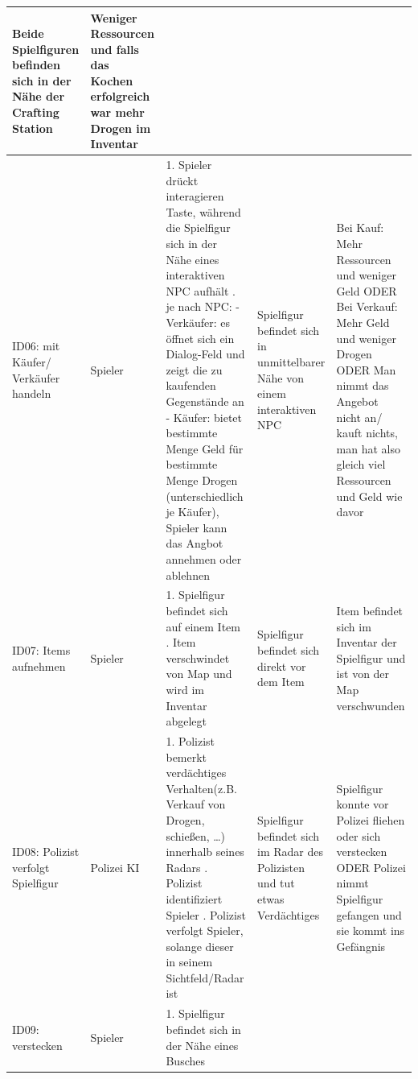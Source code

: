 \begin{longtable}{|p{1.6cm}|p{1.9cm}|p{5.5cm}|p{3.2cm}|p{4.2cm}|}
    Beide Spielfiguren befinden sich in der Nähe der Crafting Station &
    Weniger Ressourcen und falls das Kochen erfolgreich war mehr Drogen im Inventar \\
    \hline
    ID06: mit Käufer/ Verkäufer handeln & Spieler &
    1. Spieler drückt interagieren Taste, während die Spielfigur sich in der Nähe eines interaktiven NPC aufhält \newline
    2. je nach NPC: \newline
    - Verkäufer: es öffnet sich ein Dialog-Feld und zeigt die zu kaufenden Gegenstände an \newline
    - Käufer: bietet bestimmte Menge Geld für bestimmte Menge Drogen (unterschiedlich je Käufer), Spieler kann das Angbot annehmen oder ablehnen &
    Spielfigur befindet sich in unmittelbarer Nähe von einem interaktiven NPC &
    Bei Kauf: Mehr Ressourcen und weniger Geld \newline
    ODER \newline
    Bei Verkauf: Mehr Geld und weniger Drogen \newline
    ODER \newline
    Man nimmt das Angebot nicht an/ kauft nichts, man hat also gleich viel Ressourcen und Geld wie davor\\
    \hline
    ID07: Items aufnehmen & Spieler &
    1. Spielfigur befindet sich auf einem Item \newline
    2. Item verschwindet von Map und wird im Inventar abgelegt &
    Spielfigur befindet sich direkt vor dem Item &
    Item befindet sich im Inventar der Spielfigur und ist von der Map verschwunden \\
    \hline
    ID08: Polizist verfolgt Spielfigur & Polizei KI&
    1. Polizist bemerkt verdächtiges Verhalten(z.B. Verkauf von Drogen, schießen, \dots) innerhalb seines Radars \newline
    2. Polizist identifiziert Spieler \newline
    3. Polizist verfolgt Spieler, solange dieser in seinem Sichtfeld/Radar ist  &
    Spielfigur befindet sich im Radar des Polizisten und tut etwas Verdächtiges &
    Spielfigur konnte vor Polizei fliehen oder sich verstecken \newline
    ODER\newline
    Polizei nimmt Spielfigur gefangen und sie kommt ins Gefängnis \\
    \hline
    ID09: verstecken & Spieler &
    1. Spielfigur befindet sich in der Nähe eines Busches\newline

\end{longtable}
